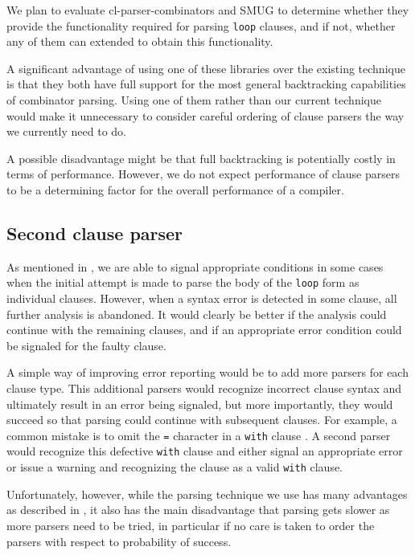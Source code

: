We plan to evaluate cl-parser-combinators and SMUG to determine
whether they provide the functionality required for parsing
\texttt{loop} clauses, and if not, whether any of them can extended to
obtain this functionality.

A significant advantage of using one of these libraries over the
existing technique is that they both have full support for the most
general backtracking capabilities of combinator parsing.  Using one of
them rather than our current technique would make it unnecessary to
consider careful ordering of clause parsers the way we currently need
to do.

A possible disadvantage might be that full backtracking is potentially
costly in terms of performance.  However, we do not expect performance
of clause parsers to be a determining factor for the overall
performance of a \commonlisp{} compiler.

\subsection{Second clause parser}

As mentioned in , we are able to signal
appropriate conditions in some cases when the initial attempt is made
to parse the body of the \texttt{loop} form as individual clauses.
However, when a syntax error is detected in some clause, all further
analysis is abandoned.  It would clearly be better if the analysis
could continue with the remaining clauses, and if an appropriate error
condition could be signaled for the faulty clause.

A simple way of improving error reporting would be to add more parsers
for each clause type.  This additional parsers would recognize
incorrect clause syntax and ultimately result in an error being
signaled, but more importantly, they would succeed so that parsing
could continue with subsequent clauses.  For example, a common mistake
is to omit the \texttt{=} character in a \texttt{with} clause
.  A second parser would recognize this defective
\texttt{with} clause and either signal an appropriate error or issue a
warning and recognizing the clause as a valid \texttt{with} clause.

Unfortunately, however, while the parsing technique we use has many
advantages as described in , it also has the main
disadvantage that parsing gets slower as more parsers need to be
tried, in particular if no care is taken to order the parsers with
respect to probability of success.

